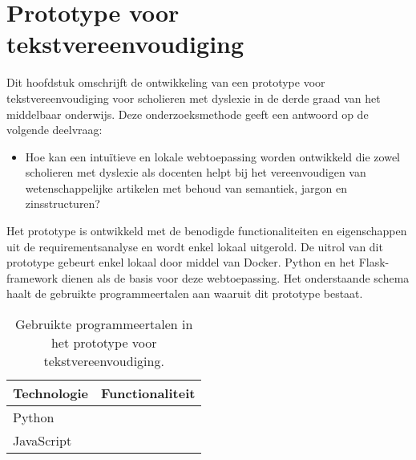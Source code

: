 \section{Prototype voor tekstvereenvoudiging}

Dit hoofdstuk omschrijft de ontwikkeling van een prototype voor tekstvereenvoudiging voor scholieren met dyslexie in de derde graad van het middelbaar onderwijs. Deze onderzoeksmethode geeft een antwoord op de volgende deelvraag: 

\begin{itemize}
	\item Hoe kan een intuïtieve en lokale webtoepassing worden ontwikkeld die zowel scholieren met dyslexie als docenten helpt bij het vereenvoudigen van wetenschappelijke artikelen met behoud van semantiek, jargon en zinsstructuren?
\end{itemize}

Het prototype is ontwikkeld met de benodigde functionaliteiten en eigenschappen uit de requirementsanalyse en wordt enkel lokaal uitgerold. De uitrol van dit prototype gebeurt enkel lokaal door middel van Docker. Python en het Flask-framework dienen als de basis voor deze webtoepassing. Het onderstaande schema haalt de gebruikte programmeertalen aan waaruit dit prototype bestaat. 

\begin{center}
	\begin{table}
	\begin{tabular}{ | m{4cm} | m{12cm} | } 
		\hline
		\textbf{Technologie} & \textbf{Functionaliteit} \\
		\hline
		Python & \\
		\hline
		JavaScript
		\hline
	\end{tabular}
	\label{table:technologies}
	\caption{Gebruikte programmeertalen in het prototype voor tekstvereenvoudiging.}
	\end{table}
\end{center}



